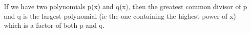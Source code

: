 If we have two polynomials p(x) and q(x), then the greatest common divisor of 
p and q is the largest polynomial (ie the one containing the highest power of x)
which is a factor of both p and q.